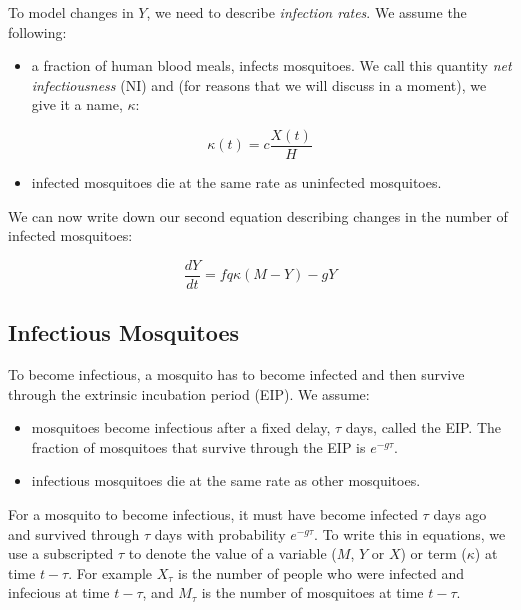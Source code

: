 \documentclass[
]{book}
\providecommand{\tightlist}{%
  \setlength{\itemsep}{0pt}\setlength{\parskip}{0pt}}
\begin{document}
To model changes in \(Y\), we need to describe \emph{infection rates}. We assume the following:

\begin{itemize}
\tightlist
\item
  a fraction of human blood meals, infects mosquitoes. We call this quantity \emph{net infectiousness} (NI) and (for reasons that we will discuss in a moment), we give it a name, \(\kappa\):
\end{itemize}

\begin{equation}
\kappa(t) = c \frac{X(t)}{H}
\label{eq:kappaDef}
\end{equation}

\begin{itemize}
\tightlist
\item
  infected mosquitoes die at the same rate as uninfected mosquitoes.
\end{itemize}

We can now write down our second equation describing changes in the number of infected mosquitoes:

\begin{equation}
\frac{dY}{dt} = f q \kappa (M-Y) -g Y
\end{equation}

\hypertarget{infectious-mosquitoes}{%
\subsection{Infectious Mosquitoes}\label{infectious-mosquitoes}}

To become infectious, a mosquito has to become infected and then survive through the extrinsic incubation period (EIP). We assume:

\begin{itemize}
\item
  mosquitoes become infectious after a fixed delay, \(\tau\) days, called the EIP. The fraction of mosquitoes that survive through the EIP is \(e^{-g \tau}\).
\item
  infectious mosquitoes die at the same rate as other mosquitoes.
\end{itemize}

For a mosquito to become infectious, it must have become infected \(\tau\) days ago and survived through \(\tau\) days with probability \(e^{-g\tau}\). To write this in equations, we use a subscripted \(\tau\) to denote the value of a variable (\(M\), \(Y\) or \(X\)) or term (\(\kappa\)) at time \(t-\tau\). For example \(X_\tau\) is the number of people who were infected and infecious at time \(t-\tau\), and \(M_\tau\) is the number of mosquitoes at time \(t-\tau\).
\end{document}
